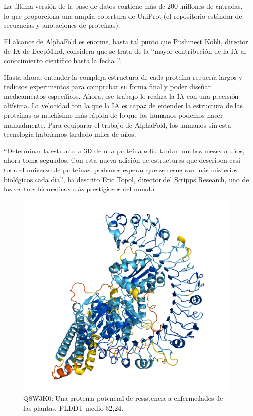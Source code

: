 \documentclass[runningheads]{llncs} %
\begin{document}
La última versión de la base de datos contiene más de 200 millones de entradas, 
lo que proporciona una amplia cobertura de UniProt 
(el repositorio estándar de secuencias y anotaciones de proteínas). 
\cite{ej-alphafold}

El alcance de AlphaFold es enorme, hasta tal punto que Pushmeet Kohli, 
director de IA de DeepMind, considera que se trata de la 
\textquotedblleft{}mayor contribución de la IA al conocimiento científico hasta la fecha
\textquotedblright{}. \cite{ej-alphafold2}

Hasta ahora, entender la compleja estructura de cada proteína requería 
largos y tediosos experimentos para comprobar su forma final y poder diseñar 
medicamentos específicos. Ahora, ese trabajo lo realiza la IA con una precisión altísima.
La velocidad con la que la IA es capaz de entender la estructura de las proteínas 
es muchísimo más rápida de lo que los humanos podemos hacer manualmente. 
Para equiparar el trabajo de AlphaFold, los humanos sin esta tecnología habríamos 
tardado miles de años. \cite{ej-alphafold2}

\textquotedblleft{}Determinar la estructura 3D de una proteína solía tardar muchos meses o años, 
ahora toma segundos. Con esta nueva adición de estructuras que describen casi 
todo el universo de proteínas, podemos esperar que se resuelvan más misterios 
biológicos cada día\textquotedblright{}, ha descrito Eric Topol, director del Scripps Research, 
uno de los centros biomédicos más prestigiosos del mundo. \cite{ej-alphafold2}


\begin{figure}
    \centering
    \includegraphics[scale=0.4]{ej1-alphafold}
    \caption{Q8W3K0: Una proteína potencial de resistencia a enfermedades de las plantas. 
    PLDDT medio 82,24. \cite{ej-alphafold}}
    \label{fig:ej-alphafold}
\end{figure}
\end{document}
